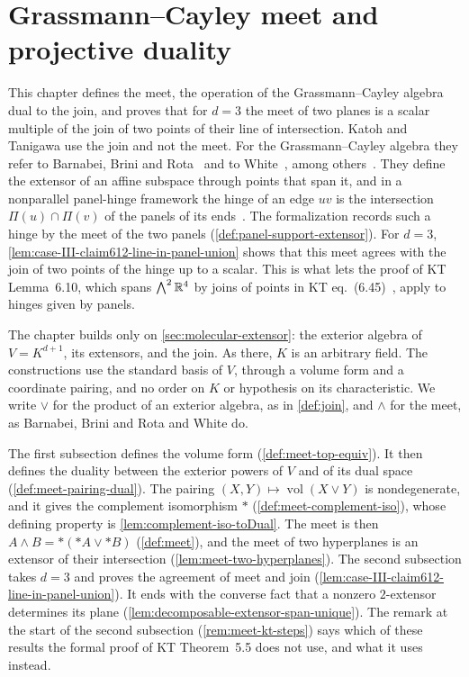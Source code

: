 \section{Grassmann--Cayley meet and projective duality}
\label{sec:molecular-meet}

This chapter defines the meet, the operation of the Grassmann--Cayley
algebra dual to the join, and proves that for $d = 3$ the meet of two
planes is a scalar multiple of the join of two points of their line of
intersection. Katoh and Tanigawa use the join and not the meet. For the
Grassmann--Cayley algebra they refer to Barnabei, Brini and
Rota~\cite{barnabeiBriniRota1985} and to White~\cite{white1994}, among
others~\cite[\S2.1]{katohTanigawa2011}. They define the extensor of an
affine subspace through points that span it, and in a nonparallel
panel-hinge framework the hinge of an edge $uv$ is the intersection
$\Pi(u) \cap \Pi(v)$ of the panels of its ends~\cite[\S5.1]{katohTanigawa2011}.
The formalization records such a hinge by the meet of the two panels
(\cref{def:panel-support-extensor}). For $d = 3$,
\cref{lem:case-III-claim612-line-in-panel-union} shows that this meet
agrees with the join of two points of the hinge up to a scalar. This is
what lets the proof of KT Lemma~6.10, which spans $\bigwedge^2 {\mathbb{R}}^4$ by
joins of points in KT eq.~(6.45)~\cite[p.~691]{katohTanigawa2011}, apply
to hinges given by panels.

The chapter builds only on \cref{sec:molecular-extensor}: the exterior
algebra of $V = K^{d+1}$, its extensors, and the join. As there, $K$ is
an arbitrary field. The constructions use the standard basis of $V$,
through a volume form and a coordinate pairing, and no order on $K$ or
hypothesis on its characteristic. We write $\vee$ for the product of an
exterior algebra, as in \cref{def:join}, and $\wedge$ for the meet, as
Barnabei, Brini and Rota and White do.

The first subsection defines the volume form (\cref{def:meet-top-equiv}).
It then defines the duality between the exterior powers of $V$ and of its
dual space (\cref{def:meet-pairing-dual}). The pairing
$(X, Y) \mapsto \operatorname{vol}(X \vee Y)$ is nondegenerate, and it
gives the complement isomorphism $*$ (\cref{def:meet-complement-iso}),
whose defining property is \cref{lem:complement-iso-toDual}. The meet is
then $A \wedge B = *({*A} \vee {*B})$ (\cref{def:meet}), and the meet of
two hyperplanes is an extensor of their intersection
(\cref{lem:meet-two-hyperplanes}). The second
subsection takes $d = 3$ and proves the agreement of meet and join
(\cref{lem:case-III-claim612-line-in-panel-union}). It ends with the
converse fact that a nonzero $2$-extensor determines its plane
(\cref{lem:decomposable-extensor-span-unique}). The remark at the start
of the second subsection (\cref{rem:meet-kt-steps}) says which of these
results the formal proof of KT Theorem~5.5 does not use, and what it
uses instead.

